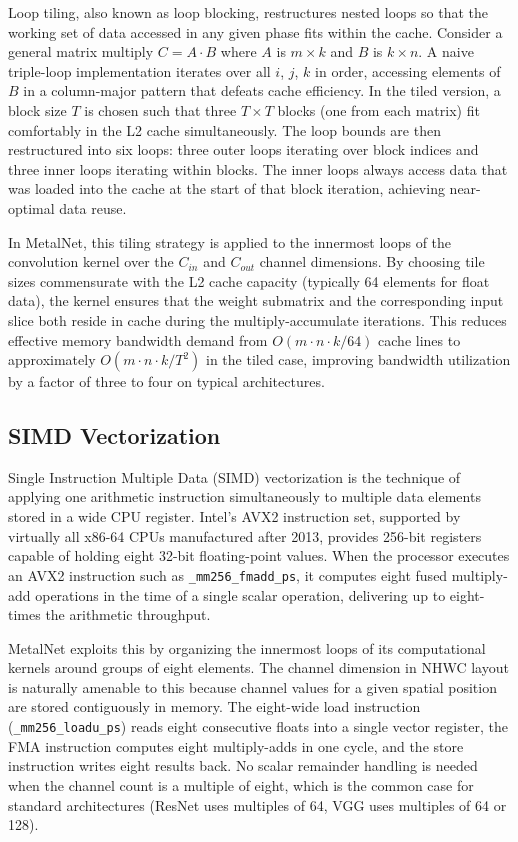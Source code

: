 \documentclass[12pt,oneside,a4paper]{report}
\begin{document}
Loop tiling, also known as loop blocking, restructures nested loops so that the working set of data accessed in any given phase fits within the cache. Consider a general matrix multiply $C = A \cdot B$ where $A$ is $m \times k$ and $B$ is $k \times n$. A naive triple-loop implementation iterates over all $i$, $j$, $k$ in order, accessing elements of $B$ in a column-major pattern that defeats cache efficiency. In the tiled version, a block size $T$ is chosen such that three $T \times T$ blocks (one from each matrix) fit comfortably in the L2 cache simultaneously. The loop bounds are then restructured into six loops: three outer loops iterating over block indices and three inner loops iterating within blocks. The inner loops always access data that was loaded into the cache at the start of that block iteration, achieving near-optimal data reuse.

In MetalNet, this tiling strategy is applied to the innermost loops of the convolution kernel over the $C_{in}$ and $C_{out}$ channel dimensions. By choosing tile sizes commensurate with the L2 cache capacity (typically 64 elements for float data), the kernel ensures that the weight submatrix and the corresponding input slice both reside in cache during the multiply-accumulate iterations. This reduces effective memory bandwidth demand from $O(m \cdot n \cdot k / 64)$ cache lines to approximately $O(m \cdot n \cdot k / T^2)$ in the tiled case, improving bandwidth utilization by a factor of three to four on typical architectures.

\subsection{SIMD Vectorization}

Single Instruction Multiple Data (SIMD) vectorization is the technique of applying one arithmetic instruction simultaneously to multiple data elements stored in a wide CPU register. Intel's AVX2 instruction set, supported by virtually all x86-64 CPUs manufactured after 2013, provides 256-bit registers capable of holding eight 32-bit floating-point values. When the processor executes an AVX2 instruction such as \texttt{\_mm256\_fmadd\_ps}, it computes eight fused multiply-add operations in the time of a single scalar operation, delivering up to eight-times the arithmetic throughput.

MetalNet exploits this by organizing the innermost loops of its computational kernels around groups of eight elements. The channel dimension in NHWC layout is naturally amenable to this because channel values for a given spatial position are stored contiguously in memory. The eight-wide load instruction (\texttt{\_mm256\_loadu\_ps}) reads eight consecutive floats into a single vector register, the FMA instruction computes eight multiply-adds in one cycle, and the store instruction writes eight results back. No scalar remainder handling is needed when the channel count is a multiple of eight, which is the common case for standard architectures (ResNet uses multiples of 64, VGG uses multiples of 64 or 128).
\end{document}
